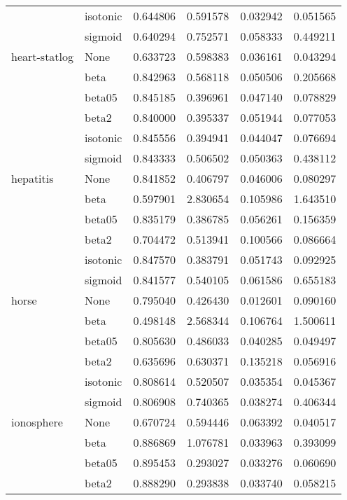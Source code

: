 \begin{tabular}{llrrrr}
        & isotonic &  0.644806 &   0.591578 &  0.032942 &  0.051565 \\
        & sigmoid &  0.640294 &   0.752571 &  0.058333 &  0.449211 \\
heart-statlog & None &  0.633723 &   0.598383 &  0.036161 &  0.043294 \\
        & beta &  0.842963 &   0.568118 &  0.050506 &  0.205668 \\
        & beta05 &  0.845185 &   0.396961 &  0.047140 &  0.078829 \\
        & beta2 &  0.840000 &   0.395337 &  0.051944 &  0.077053 \\
        & isotonic &  0.845556 &   0.394941 &  0.044047 &  0.076694 \\
        & sigmoid &  0.843333 &   0.506502 &  0.050363 &  0.438112 \\
hepatitis & None &  0.841852 &   0.406797 &  0.046006 &  0.080297 \\
        & beta &  0.597901 &   2.830654 &  0.105986 &  1.643510 \\
        & beta05 &  0.835179 &   0.386785 &  0.056261 &  0.156359 \\
        & beta2 &  0.704472 &   0.513941 &  0.100566 &  0.086664 \\
        & isotonic &  0.847570 &   0.383791 &  0.051743 &  0.092925 \\
        & sigmoid &  0.841577 &   0.540105 &  0.061586 &  0.655183 \\
horse & None &  0.795040 &   0.426430 &  0.012601 &  0.090160 \\
        & beta &  0.498148 &   2.568344 &  0.106764 &  1.500611 \\
        & beta05 &  0.805630 &   0.486033 &  0.040285 &  0.049497 \\
        & beta2 &  0.635696 &   0.630371 &  0.135218 &  0.056916 \\
        & isotonic &  0.808614 &   0.520507 &  0.035354 &  0.045367 \\
        & sigmoid &  0.806908 &   0.740365 &  0.038274 &  0.406344 \\
ionosphere & None &  0.670724 &   0.594446 &  0.063392 &  0.040517 \\
        & beta &  0.886869 &   1.076781 &  0.033963 &  0.393099 \\
        & beta05 &  0.895453 &   0.293027 &  0.033276 &  0.060690 \\
        & beta2 &  0.888290 &   0.293838 &  0.033740 &  0.058215 \\

\end{tabular}
